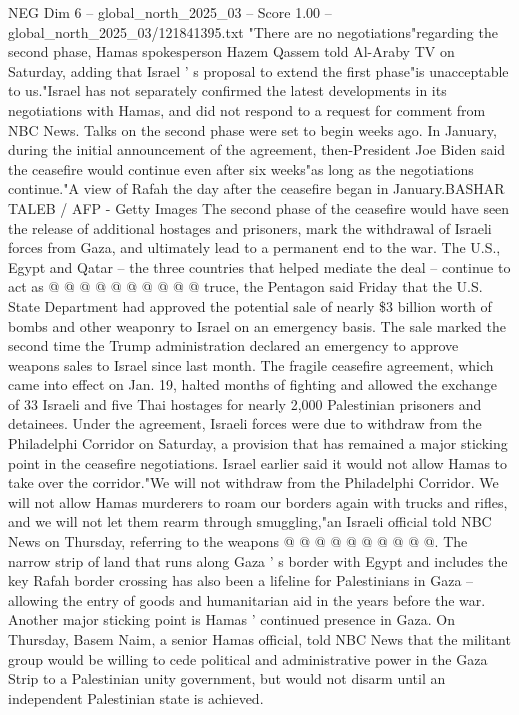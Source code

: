 \begin{textsample}{NEG Dim 6 – global\_north\_2025\_03 – Score 1.00 – global\_north\_2025\_03/121841395.txt}  \label{ex:f6_neg_169}
"There are no negotiations"regarding the second phase, Hamas spokesperson Hazem Qassem told Al-Araby TV on Saturday, adding that Israel ' s proposal to extend the first phase"is unacceptable to us."Israel has not separately confirmed the latest developments in its negotiations with Hamas, and did not respond to a request for comment from NBC News.
Talks on the second phase were set to begin weeks ago.
In January, during the initial announcement of the agreement, then-President Joe Biden said the ceasefire would continue even after six weeks"as long as the negotiations continue."A view of Rafah the day after the ceasefire began in January.BASHAR TALEB / AFP - Getty Images The second phase of the ceasefire would have seen the release of additional hostages and prisoners, mark the withdrawal of Israeli forces from Gaza, and ultimately lead to a permanent end to the war.
The U.S., Egypt and Qatar -- the three countries that helped mediate the deal -- continue to act as @ @ @ @ @ @ @ @ @ @ truce, the Pentagon said Friday that the U.S.
State Department had approved the potential sale of nearly \$3 billion worth of bombs and other weaponry to Israel on an emergency basis.
The sale marked the second time the Trump administration declared an emergency to approve weapons sales to Israel since last month.
The fragile ceasefire agreement, which came into effect on Jan. 19, halted months of fighting and allowed the exchange of 33 Israeli and five Thai hostages for nearly 2,000 Palestinian prisoners and detainees.
Under the agreement, Israeli forces were due to withdraw from the Philadelphi Corridor on Saturday, a provision that has remained a major sticking point in the ceasefire negotiations.
Israel earlier said it would not allow Hamas to take over the corridor."We will not withdraw from the Philadelphi Corridor.
We will not allow Hamas murderers to roam our borders again with trucks and rifles, and we will not let them rearm through smuggling,"an Israeli official told NBC News on Thursday, referring to the weapons @ @ @ @ @ @ @ @ @ @.
The narrow strip of land that runs along Gaza ' s border with Egypt and includes the key Rafah border crossing has also been a lifeline for Palestinians in Gaza -- allowing the entry of goods and humanitarian aid in the years before the war.
Another major sticking point is Hamas ' continued presence in Gaza.
On Thursday, Basem Naim, a senior Hamas official, told NBC News that the militant group would be willing to cede political and administrative power in the Gaza Strip to a Palestinian unity government, but would not disarm until an independent Palestinian state is achieved.

\end{textsample}
